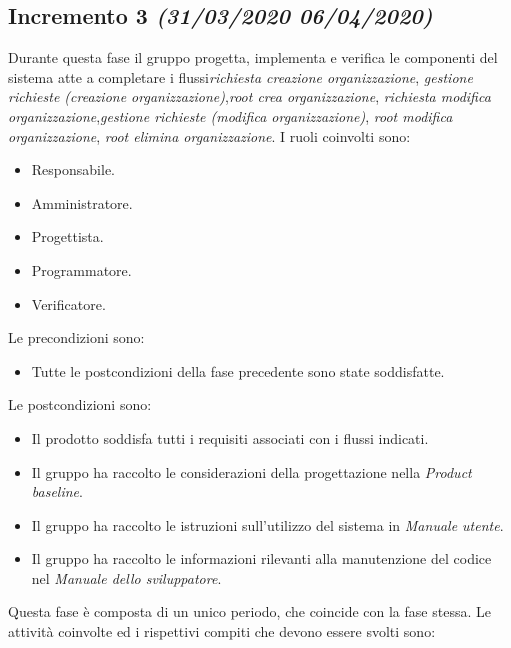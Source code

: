 \documentclass[../piano-di-progetto.tex]{subfiles}
\begin{document}
\subsection[Incremento 3]{Incremento 3 {\normalsize\normalfont\itshape(31/03/2020  06/04/2020)}}%
\label{sub:incremento_3}
Durante questa fase il gruppo progetta, implementa e verifica le componenti del sistema atte a completare i flussi\textit {richiesta creazione organizzazione}, \textit{gestione richieste (creazione organizzazione)},\textit{root crea organizzazione}, \textit{richiesta modifica organizzazione},\textit{gestione richieste (modifica organizzazione)}, \textit{root modifica organizzazione}, \textit{root elimina organizzazione}.
I ruoli coinvolti sono:
\begin{itemize}
  \item Responsabile.
  \item Amministratore.
  \item Progettista.
  \item Programmatore.
  \item Verificatore.
\end{itemize}
Le precondizioni sono:
\begin{itemize}
  \item Tutte le postcondizioni della fase precedente sono state soddisfatte.
\end{itemize}
Le postcondizioni sono:
\begin{itemize}
  \item Il prodotto soddisfa tutti i requisiti associati con i flussi indicati.
  \item Il gruppo ha raccolto le considerazioni della progettazione nella \textit{Product baseline}.
  \item Il gruppo ha raccolto le istruzioni sull'utilizzo del sistema in \textit{Manuale utente}.
  \item Il gruppo ha raccolto le informazioni rilevanti alla manutenzione del codice nel \textit{Manuale dello sviluppatore}.
\end{itemize}
Questa fase è composta di un unico periodo, che coincide con la fase stessa.
Le attività coinvolte ed i rispettivi compiti che devono essere svolti sono:
\end{document}
